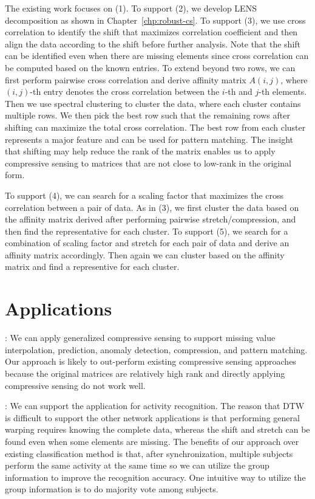 The existing work focuses on (1). To support (2), we develop LENS decomposition as shown in Chapter~\ref{chp:robust-cs}. To support (3), we use cross correlation to identify the shift that maximizes correlation coefficient and then align the data according to the shift before further analysis. Note that the shift can be identified even when there are missing elements since cross correlation can be computed based on the known entries. To extend beyond two rows, we can first perform pairwise cross correlation and derive affinity matrix $A(i, j)$, where $(i, j)$-th entry denotes the cross correlation between the $i$-th and $j$-th elements. Then we use spectral clustering to cluster the data, where each cluster contains multiple rows. We then pick the best row such that the remaining rows after shifting can maximize the total cross correlation. The best row from each cluster represents a major feature and can be used for pattern matching. The insight that shifting may help reduce the rank of the matrix enables us to apply compressive sensing to matrices that are not close to low-rank in the original form.

To support (4), we can search for a scaling factor that maximizes the cross correlation between a pair of data. As in (3), we first cluster the data based on the affinity matrix derived after performing pairwise stretch/compression, and then find the representative for each cluster. To support (5), we search for a combination of scaling factor and stretch for each pair of data and derive an affinity matrix accordingly. Then again we can cluster based on the affinity matrix and find a representive for each cluster. 

\section{Applications}

: 
We can apply generalized compressive sensing to support missing value interpolation, prediction, anomaly detection, compression, and pattern matching. Our approach is likely to out-perform existing compressive sensing approaches because the original matrices are relatively high rank and directly applying compressive sensing do not work well.

: 
We can support the application for activity recognition. The reason that DTW is difficult to support the other network applications is that performing general warping requires knowing the complete data, whereas the shift and stretch can be found even when some elements are missing. The benefits of our approach over existing classification method is that, after synchronization, multiple subjects perform the same activity at the same time so we can utilize the group information to improve the recognition accuracy. One intuitive way to utilize the group information is to do majority vote among subjects. 


